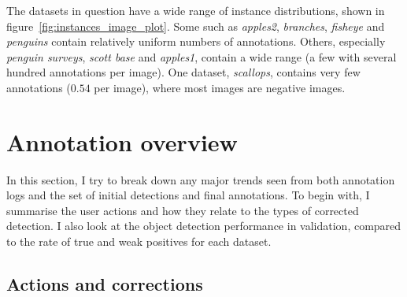 The datasets in question have a wide range of instance distributions, shown in figure~\ref{fig:instances_image_plot}. Some such as \emph{apples2}, \emph{branches}, \emph{fisheye} and \emph{penguins} contain relatively uniform numbers of annotations. Others, especially \emph {penguin surveys}, \emph{scott base} and \emph{apples1}, contain a wide range (a few with several hundred annotations per image). One dataset, \emph{scallops}, contains very few annotations ($0.54$ per image), where most images are negative images.


\section {Annotation overview}
\label{sec:annotation_overview}

In this section, I try to break down any major trends seen from both annotation logs and the set of initial detections and final annotations. To begin with, I summarise the user actions and how they relate to the types of corrected detection. I also look at the object detection performance in validation, compared to the rate of true and weak positives for each dataset.

\subsection {Actions and corrections}

